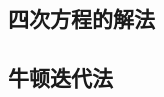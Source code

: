 \subsection{四次方程的解法}
\label{sec:solve-equation-with-4-degree}

\subsection{牛顿迭代法}
\label{sec:newton-iterator-method}



